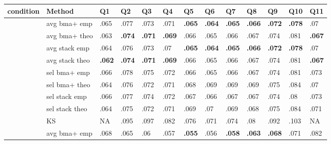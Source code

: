 \documentclass[border={-20pt 28pt 20pt -20pt}]{standalone}
\begin{document}
                   \pagecolor{Mycolor2}
                   \renewcommand{\arraystretch}{1.1} 
\centering\begingroup\fontsize{9}{11}\selectfont

\begin{tabular}{>{\centering\arraybackslash}p{4.4em}>{\centering\arraybackslash}p{7em}>{\centering\arraybackslash}p{1.8em}>{\centering\arraybackslash}p{1.8em}>{\centering\arraybackslash}p{1.8em}>{\centering\arraybackslash}p{1.8em}>{\centering\arraybackslash}p{1.8em}>{\centering\arraybackslash}p{1.8em}>{\centering\arraybackslash}p{1.8em}>{\centering\arraybackslash}p{1.8em}>{\centering\arraybackslash}p{1.8em}>{\centering\arraybackslash}p{1.8em}>{\centering\arraybackslash}p{1.8em}}
\toprule
\textbf{condition} & \textbf{Method} & \textbf{Q1} & \textbf{Q2} & \textbf{Q3} & \textbf{Q4} & \textbf{Q5} & \textbf{Q6} & \textbf{Q7} & \textbf{Q8} & \textbf{Q9} & \textbf{Q10} & \textbf{Q11}\\
\midrule
 & avg bma+ emp & .065 & .077 & .073 & .071 & \textbf{.065} & \textbf{.064} & \textbf{.065} & \textbf{.066} & \textbf{.072} & \textbf{.078} & .07\\

 & avg bma+ theo & .063 & \textbf{.074} & \textbf{.071} & \textbf{.069} & .066 & .065 & .066 & .067 & .074 & .081 & \textbf{.067}\\

 & avg stack emp & .064 & .076 & .073 & .07 & \textbf{.065} & \textbf{.064} & \textbf{.065} & \textbf{.066} & \textbf{.072} & \textbf{.078} & .07\\

 & avg stack theo & \textbf{.062} & \textbf{.074} & \textbf{.071} & \textbf{.069} & .066 & .065 & .066 & .067 & .074 & .081 & \textbf{.067}\\

 & sel bma+ emp & .066 & .078 & .075 & .072 & .066 & .065 & .066 & .067 & .074 & .081 & .073\\

 & sel bma+ theo & .064 & .076 & .072 & .071 & .068 & .069 & .069 & .069 & .075 & .084 & .07\\

 & sel stack emp & .066 & .077 & .074 & .072 & .067 & .066 & .067 & .067 & .074 & .08 & .073\\

 & sel stack theo & .064 & .075 & .072 & .071 & .069 & .07 & .069 & .068 & .075 & .084 & .071\\

\multirow{-9}{4.4em}{\centering\arraybackslash \textbf{I = 10  N = 100}} & KS & NA & .095 & .097 & .082 & .076 & .071 & .074 & .08 & .092 & .103 & NA\\
\cmidrule{1-13}
 & avg bma+ emp & .068 & .065 & .06 & .057 & \textbf{.055} & .056 & \textbf{.058} & \textbf{.063} & \textbf{.068} & .071 & .082\\


\end{tabular}
\end{document}
